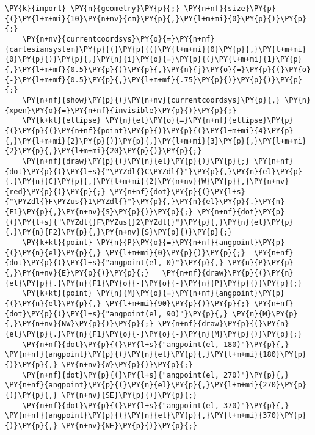 \begin{Verbatim}[commandchars=\\\{\}]
    \PY{k}{import} \PY{n}{geometry}\PY{p}{;} \PY{n+nf}{size}\PY{p}{(}\PY{l+m+mi}{10}\PY{n+nv}{cm}\PY{p}{,}\PY{l+m+mi}{0}\PY{p}{)}\PY{p}{;}
    \PY{n+nv}{currentcoordsys}\PY{o}{=}\PY{n+nf}{cartesiansystem}\PY{p}{(}\PY{p}{(}\PY{l+m+mi}{0}\PY{p}{,}\PY{l+m+mi}{0}\PY{p}{)}\PY{p}{,}\PY{n}{i}\PY{o}{=}\PY{p}{(}\PY{l+m+mi}{1}\PY{p}{,}\PY{l+m+mf}{0.5}\PY{p}{)}\PY{p}{,}\PY{n}{j}\PY{o}{=}\PY{p}{(}\PY{o}{-}\PY{l+m+mf}{0.5}\PY{p}{,}\PY{l+m+mf}{.75}\PY{p}{)}\PY{p}{)}\PY{p}{;}
    \PY{n+nf}{show}\PY{p}{(}\PY{n+nv}{currentcoordsys}\PY{p}{,} \PY{n}{xpen}\PY{o}{=}\PY{n+nf}{invisible}\PY{p}{)}\PY{p}{;}
    \PY{k+kt}{ellipse} \PY{n}{el}\PY{o}{=}\PY{n+nf}{ellipse}\PY{p}{(}\PY{p}{(}\PY{n+nf}{point}\PY{p}{)}\PY{p}{(}\PY{l+m+mi}{4}\PY{p}{,}\PY{l+m+mi}{2}\PY{p}{)}\PY{p}{,}\PY{l+m+mi}{3}\PY{p}{,}\PY{l+m+mi}{2}\PY{p}{,}\PY{l+m+mi}{20}\PY{p}{)}\PY{p}{;}
    \PY{n+nf}{draw}\PY{p}{(}\PY{n}{el}\PY{p}{)}\PY{p}{;} \PY{n+nf}{dot}\PY{p}{(}\PY{l+s}{"\PYZdl{}C\PYZdl{}"}\PY{p}{,}\PY{n}{el}\PY{p}{.}\PY{n}{C}\PY{p}{,}\PY{l+m+mi}{2}\PY{n+nv}{W}\PY{p}{,}\PY{n+nv}{red}\PY{p}{)}\PY{p}{;} \PY{n+nf}{dot}\PY{p}{(}\PY{l+s}{"\PYZdl{}F\PYZus{}1\PYZdl{}"}\PY{p}{,}\PY{n}{el}\PY{p}{.}\PY{n}{F1}\PY{p}{,}\PY{n+nv}{S}\PY{p}{)}\PY{p}{;} \PY{n+nf}{dot}\PY{p}{(}\PY{l+s}{"\PYZdl{}F\PYZus{}2\PYZdl{}"}\PY{p}{,}\PY{n}{el}\PY{p}{.}\PY{n}{F2}\PY{p}{,}\PY{n+nv}{S}\PY{p}{)}\PY{p}{;}
    \PY{k+kt}{point} \PY{n}{P}\PY{o}{=}\PY{n+nf}{angpoint}\PY{p}{(}\PY{n}{el}\PY{p}{,} \PY{l+m+mi}{0}\PY{p}{)}\PY{p}{;}  \PY{n+nf}{dot}\PY{p}{(}\PY{l+s}{"angpoint(el, 0)"}\PY{p}{,} \PY{n}{P}\PY{p}{,}\PY{n+nv}{E}\PY{p}{)}\PY{p}{;}   \PY{n+nf}{draw}\PY{p}{(}\PY{n}{el}\PY{p}{.}\PY{n}{F1}\PY{o}{-}\PY{o}{-}\PY{n}{P}\PY{p}{)}\PY{p}{;}
    \PY{k+kt}{point} \PY{n}{M}\PY{o}{=}\PY{n+nf}{angpoint}\PY{p}{(}\PY{n}{el}\PY{p}{,} \PY{l+m+mi}{90}\PY{p}{)}\PY{p}{;} \PY{n+nf}{dot}\PY{p}{(}\PY{l+s}{"angpoint(el, 90)"}\PY{p}{,} \PY{n}{M}\PY{p}{,}\PY{n+nv}{NW}\PY{p}{)}\PY{p}{;} \PY{n+nf}{draw}\PY{p}{(}\PY{n}{el}\PY{p}{.}\PY{n}{F1}\PY{o}{-}\PY{o}{-}\PY{n}{M}\PY{p}{)}\PY{p}{;}
    \PY{n+nf}{dot}\PY{p}{(}\PY{l+s}{"angpoint(el, 180)"}\PY{p}{,} \PY{n+nf}{angpoint}\PY{p}{(}\PY{n}{el}\PY{p}{,}\PY{l+m+mi}{180}\PY{p}{)}\PY{p}{,} \PY{n+nv}{W}\PY{p}{)}\PY{p}{;}
    \PY{n+nf}{dot}\PY{p}{(}\PY{l+s}{"angpoint(el, 270)"}\PY{p}{,} \PY{n+nf}{angpoint}\PY{p}{(}\PY{n}{el}\PY{p}{,}\PY{l+m+mi}{270}\PY{p}{)}\PY{p}{,} \PY{n+nv}{SE}\PY{p}{)}\PY{p}{;}
    \PY{n+nf}{dot}\PY{p}{(}\PY{l+s}{"angpoint(el, 370)"}\PY{p}{,} \PY{n+nf}{angpoint}\PY{p}{(}\PY{n}{el}\PY{p}{,}\PY{l+m+mi}{370}\PY{p}{)}\PY{p}{,} \PY{n+nv}{NE}\PY{p}{)}\PY{p}{;}

\end{Verbatim}
